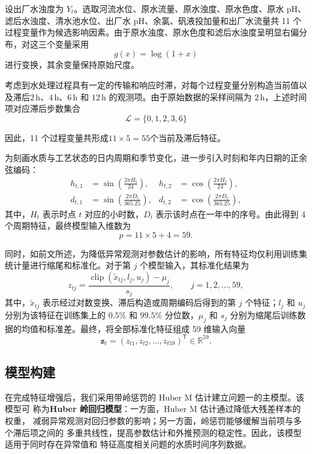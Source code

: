 \documentclass[UTF8,12pt,a4paper]{ctexart}
\begin{document}
设出厂水浊度为 $Y_t$。选取河流水位、原水流量、原水浊度、原水色度、原水 pH、滤后水浊度、清水池水位、出厂水 pH、余氯、矾液投加量和出厂水流量共 11 个过程变量作为候选影响因素。由于原水浊度、原水色度和滤后水浊度呈明显右偏分布，对这三个变量采用 \[g(x)=\log(1+x)\]进行变换，其余变量保持原始尺度。

考虑到水处理过程具有一定的传输和响应时滞，对每个过程变量分别构造当前值以及滞后$2\,\mathrm{h}$、$4\,\mathrm{h}$、$6\,\mathrm{h}$ 和 $12\,\mathrm{h}$ 的观测项。由于原始数据的采样间隔为 $2\,\mathrm{h}$，上述时间项对应滞后步数集合\[\mathcal{L}=\{0,1,2,3,6\}\]

因此，11 个过程变量共形成$11\times 5=55$个当前及滞后特征。

为刻画水质与工艺状态的日内周期和季节变化，进一步引入时刻和年内日期的正余弦编码：
\begin{equation}
\begin{aligned}
h_{t,1}&=\sin\left(\frac{2\pi H_t}{24}\right),&
h_{t,2}&=\cos\left(\frac{2\pi H_t}{24}\right),\\
d_{t,1}&=\sin\left(\frac{2\pi D_t}{365.25}\right),&
d_{t,2}&=\cos\left(\frac{2\pi D_t}{365.25}\right),
\end{aligned}
\label{eq:cyclic-features}
\end{equation}
其中，$H_t$ 表示时点 $t$ 对应的小时数，$D_t$ 表示该时点在一年中的序号。由此得到 4 个周期特征，最终模型输入维数为
\[
p=11\times 5+4=59.
\]

同时，如前文所述，为降低异常观测对参数估计的影响，所有特征均仅利用训练集统计量进行缩尾和标准化。对于第 $j$ 个模型输入，其标准化结果为
  \begin{equation}
  z_{tj}
  =
  \frac{
  \operatorname{clip}\!\left(\widetilde{x}_{tj},l_j,u_j\right)-\mu_j
  }{s_j},
  \qquad j=1,2,\ldots,59,
  \label{eq:standardize}
  \end{equation}
  其中，$\widetilde{x}_{tj}$ 表示经过对数变换、滞后构造或周期编码后得到的第 $j$
  个特征；$l_j$ 和 $u_j$ 分别为该特征在训练集上的 $0.5\%$ 和 $99.5\%$ 分位数，$
  \mu_j$ 和 $s_j$ 分别为缩尾后训练数据的均值和标准差。最终，将全部标准化特征组成
  59 维输入向量
  \begin{equation}
  \boldsymbol{z}_t
  =
  \left(z_{t1},z_{t2},\ldots,z_{t59}\right)^{\mathsf T}
  \in\mathbb{R}^{59}.
  \label{eq:q1-feature-vector}
  \end{equation}

\subsection{模型构建}
在完成特征增强后，我们采用带岭惩罚的 Huber M 估计建立问题一的主模型。该模型可
称为\textbf{Huber 岭回归模型}\cite{hampel1992,yasin2021}：一方面，Huber M 估计通过降低大残差样本的权重，
减弱异常观测对回归参数的影响；另一方面，岭惩罚能够缓解当前项与多个滞后项之间的
多重共线性，提高参数估计和外推预测的稳定性。因此，该模型适用于同时存在异常值和
特征高度相关问题的水质时间序列数据。
\end{document}
